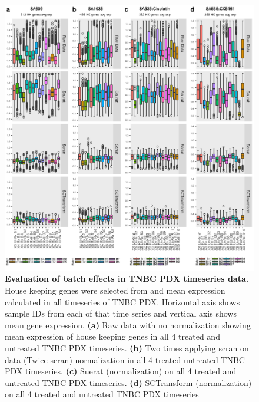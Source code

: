 \begin{figure}
\centering
\includegraphics[width=\textwidth]{Figures/chap5/Comparisonofbatcheffects.png}
	
\caption[Summary of overall read count of the data presented.]
	{\small
	\textbf{Evaluation of batch effects in TNBC PDX timeseries data.}
	  House keeping genes were selected from \cite{lin2019evaluating} and mean expression calculated in all timeseries of TNBC PDX. Horizontal axis shows sample IDs from each of that time series and vertical axis shows mean gene expression.
	   \textbf{(a)} Raw data with no normalization showing mean expression of house keeping genes in all 4 treated and untreated TNBC PDX timeseries. 
	    \textbf{(b)} Two times applying scran on data (Twice scran) normalization  in all 4 treated untreated TNBC PDX timeseries.
	    \textbf{(c)} Suerat (normalization) on  all 4 treated and untreated TNBC PDX timeseries.
	    \textbf{(d)} SCTransform (normalization) on  all 4 treated and  untreated TNBC PDX timeseries
	}
	\label{fig:Comparisonofbatcheffects}
\end{figure}


